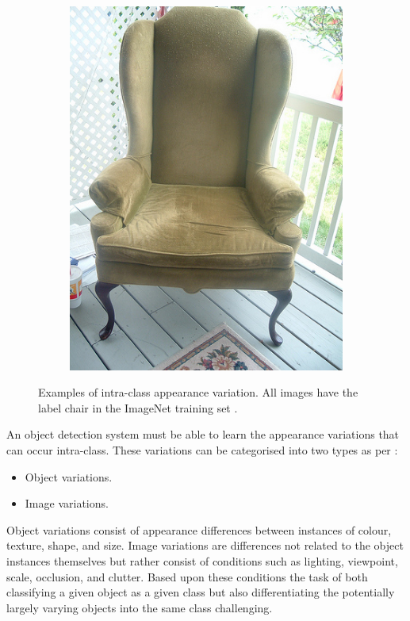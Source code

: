 \begin{figure}[H]
\begin{subfigure}[b]{0.2\textwidth}
        \includegraphics[width=\textwidth]{Figs/Problem/chair4.jpeg}
        \caption{}
    \end{subfigure}
    \caption{Examples of intra-class appearance variation. All images have the label chair in the ImageNet training set \cite{imagenet}.}
    \label{fig:intra_ex}
\end{figure} 

An object detection system must be able to learn the appearance variations that can occur intra-class. These variations can be categorised into two types as per \cite{schroff}:

\begin{itemize}
	\item Object variations.
	\item Image variations.
\end{itemize}

Object variations consist of appearance differences between instances of colour, texture, shape, and size. Image variations are differences not related to the object instances themselves but rather consist of conditions such as lighting, viewpoint, scale, occlusion, and clutter. Based upon these conditions the task of both classifying a given object as a given class but also differentiating the potentially largely varying objects into the same class challenging.

